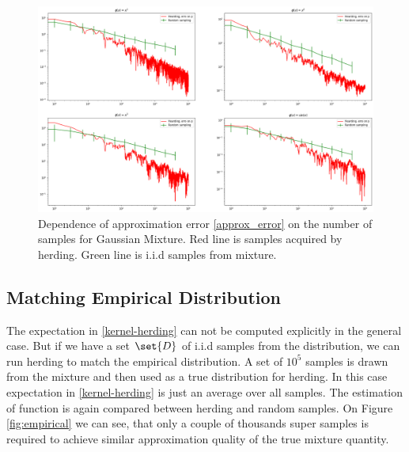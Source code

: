 \documentclass[tablecaption=bottom,wcp]{jmlr} %
\begin{document}
        \begin{figure}
            \includegraphics[width=\textwidth]{images/true}
            \caption{Dependence of approximation error \eqref{approx_error} on the number of samples for Gaussian Mixture. Red line is samples acquired by herding. Green line is i.i.d samples from mixture.}
            \label{fig:true}
        \end{figure}

    \subsection{Matching Empirical Distribution} \label{subsec:empirical}
        The expectation in \eqref{kernel-herding} can not be computed explicitly in the general case. But if we  have a set $\set{D}$ of i.i.d samples from the distribution, we can run herding to match the empirical distribution. A set of $10^5$ samples is drawn from the mixture and then used as a true distribution for herding. In this case expectation in \eqref{kernel-herding} is just an average over all samples. The estimation of function is again compared between herding and random samples. On Figure \ref{fig:empirical} we can see, that only a couple of thousands super samples is required to achieve similar approximation quality of the true mixture quantity.
\end{document}
